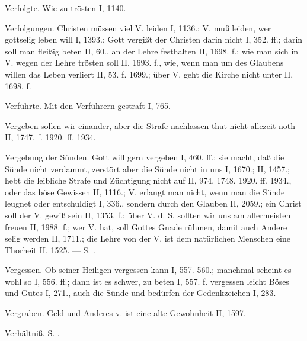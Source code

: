 Verfolgte. Wie zu trösten I, 1140.

Verfolgungen. Christen müssen viel V. leiden I, 1136.; V. muß leiden, wer gottselig leben will I, 1393.; Gott vergißt der Christen darin nicht I, 352. ff.; darin soll man fleißig beten II, 60., an der Lehre festhalten II, 1698. f.; wie man sich in V. wegen der Lehre trösten soll II, 1693. f., wie, wenn man um des Glaubens willen das Leben verliert II, 53. f. 1699.; über V. geht die Kirche nicht unter II, 1698. f.

Verführte. Mit den Verführern gestraft I, 765.

Vergeben sollen wir einander, aber die Strafe nachlassen thut nicht allezeit noth II, 1747. f. 1920. ff. 1934.

Vergebung der Sünden. Gott will gern vergeben I, 460. ff.; sie macht, daß die Sünde nicht verdammt, zerstört aber die Sünde nicht in uns I, 1670.; II, 1457.; hebt die leibliche Strafe und Züchtigung nicht auf II, 974. 1748. 1920. ff. 1934., oder das böse Gewissen II, 1116.; V. erlangt man nicht, wenn man die Sünde leugnet oder entschuldigt I, 336., sondern durch den Glauben II, 2059.; ein Christ soll der V. gewiß sein II, 1353. f.; über V. d. S. sollten wir uns am allermeisten freuen II, 1988. f.; wer V. hat, soll Gottes Gnade rühmen, damit auch Andere selig werden II, 1711.; die Lehre von der V. ist dem natürlichen Menschen eine Thorheit II, 1525. — S. .

Vergessen. Ob  seiner Heiligen vergessen kann I, 557. 560.; manchmal scheint es wohl so I, 556. ff.; dann ist es schwer, zu beten I, 557. f.  vergessen leicht Böses und Gutes I, 271., auch die Sünde und bedürfen der Gedenkzeichen I, 283.

Vergraben. Geld und Anderes v. ist eine alte Gewohnheit II, 1597.

Verhältniß. S. .

